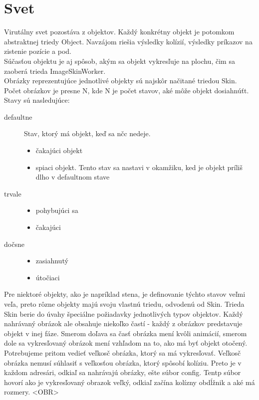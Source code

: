 \section{Svet}
Virutálny svet pozostáva z objektov. Každý konkrétny objekt je potomkom abstraktnej triedy Object. Navzájom riešia výsledky kolízií, výsledky príkazov na zistenie pozície a pod.\\
Súčasťou objektu je aj spôsob, akým sa objekt vykresľuje na plochu, čim sa zaoberá trieda ImageSkinWorker. \\
Obrázky reprezentujúce jednotlivé objekty sú najskôr načitané triedou Skin. Počet obrázkov je presne N, kde N je počet stavov, aké môže objekt dosiahnúťt. Stavy sú nasledujúce:
\begin{description}
\item [defaultne] \hfill \newline
Stav, ktorý má objekt, keď sa nčc nedeje.
\begin{itemize}
\item čakajúci objekt
\item spiaci objekt. Tento stav sa nastavi v okamžiku, ked je objekt príliš dlho v defaultnom stave
\end{itemize}
\item [trvale]
\begin{itemize}
\item pohybujúci sa
\item čakajúci
\end{itemize}
\item [dočsne]
\begin{itemize}
\item zasiahnutý
\item útočiaci
\end{itemize}
\end{description}
 Pre niektoré objekty, ako je napríklad stena, je definovanie týchto stavov veľmi veľa, preto rôzne objekty majú svoju vlastnú triedu, odvodenú od Skin. Trieda Skin berie do úvahy špeciálne požiadavky jednotlivých typov objektov. Každý nahrávaný obrázok ale obsahuje niekoľko častí - každý z obrázkov predstavuje objekt v inej fáze. Smerom doľava sa časť obrázka mení kvôli animácií, smerom dole sa vykresľovaný obrázok mení vzhľadom na to, ako má byť objekt otočený. Potrebujeme pritom vedieť veľkosč obrázka, ktorý sa má vykresľovať. Veľkosč obrázka nemusí súhlasiť s veľkosťou obrázka, ktorý spôsobí kolíziu. Preto je v každom adresári, odkiaľ sa nahrávajú obrázky, ešte súbor config. Tentp súbor hovorí ako je vykresľovaný obrazok veľký, odkiaľ začína kolízny obdĺžnik a aké má rozmery. <OBR>\\

